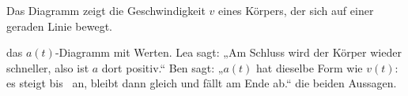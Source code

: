 Das Diagramm zeigt die Geschwindigkeit $v$ eines Körpers, der sich auf einer geraden Linie bewegt.
\begin{center}
\end{center}
\begin{abcliste}
\abc {} das $a(t)$-Diagramm mit Werten.
\abc Lea sagt: „Am Schluss wird der Körper wieder schneller, also ist $a$ dort positiv.“ Ben sagt: „$a(t)$ hat dieselbe Form wie $v(t)$: es steigt bis \tOneO\ an, bleibt dann gleich und fällt am Ende ab.“  die beiden Aussagen.
\end{abcliste}
